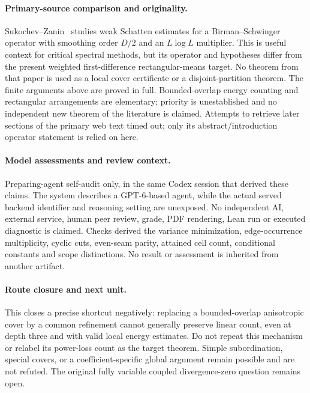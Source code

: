 \documentclass[11pt]{article}
\begin{document}
\paragraph{Primary-source comparison and originality.}
Sukochev--Zanin~\cite{SZ22} studies weak Schatten estimates for a
Birman--Schwinger operator with smoothing order $D/2$ and an $L\log L$
multiplier. This is useful context for critical spectral methods, but its
operator and hypotheses differ from the present weighted first-difference
rectangular-means target. No theorem from that paper is used as a local
cover certificate or a disjoint-partition theorem. The finite arguments
above are proved in full. Bounded-overlap energy counting and rectangular
arrangements are elementary; priority is unestablished and no independent
new theorem of the literature is claimed. Attempts to retrieve later
sections of the primary web text timed out; only its abstract/introduction
operator statement is relied on here.

\paragraph{Model assessments and review context.}
Preparing-agent self-audit only, in the same Codex session that derived these
claims. The system describes a GPT-6-based agent, while the actual served
backend identifier and reasoning setting are unexposed. No independent AI,
external service, human peer review, grade, PDF rendering, Lean run or
executed diagnostic is claimed. Checks derived the variance minimization,
edge-occurrence multiplicity, cyclic cuts, even-seam parity, attained cell
count, conditional constants and scope distinctions. No result or assessment
is inherited from another artifact.

\paragraph{Route closure and next unit.}
This closes a precise shortcut negatively: replacing a bounded-overlap
anisotropic cover by a common refinement cannot generally preserve linear
count, even at depth three and with valid local energy estimates. Do not
repeat this mechanism or relabel its power-loss count as the target theorem.
Simple subordination, special covers, or a coefficient-specific global
argument remain possible and are not refuted. The original fully variable
coupled divergence-zero question remains open.
\end{document}
